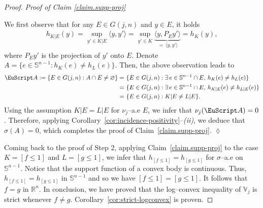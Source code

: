 \documentclass[11pt]{article}
\theoremstyle{definition}
\numberwithin{equation}{section}
\newcommand{\R}{\mathbb{R}}
\newcommand{\Sph}{\mathbb{S}}        %
\newcommand{\Gr}[2]{G(#1,#2)}        %
\newcommand{\opV}{\mathds{V}}       %
\begin{document}
\begin{proof}
\textit{Proof of Claim \ref{claim.supp-proj}}

We first observe that for any $E \in \Gr{j}{n}$ and $y \in E$, it holds
\begin{align*}
	h_{K \vert E}(y) = \sup_{y' \in K \vert E} \langle y, y' \rangle = \sup_{y' \in K} \underbrace{\langle y, P_E y' \rangle}_{\, = \, \langle y, y' \rangle} = h_K(y), 
\end{align*}
where $P_E y'$ is the projection of $y'$ onto $E$.
Denote $A = \{ e \in \Sph^{n - 1}: h_K(e) \neq h_L(e) \}$.
Then, the above observation leads to
\begin{align*}
	\EuScript A := \{ E \in \Gr{j}{n}: A \cap  E \neq \varnothing \} = & ~ 
	\{ E \in \Gr{j}{n}: \exists \, e \in \Sph^{n - 1} \cap E, \, h_K(e) \neq h_L(e) \}
	\\
	= & ~ 
	\{ E \in \Gr{j}{n}:  \exists \, e \in \Sph^{n - 1} \cap E, \, h_{K \vert E}(e) \neq h_{L \vert E}(e) \} \\
	= & ~
	\{ E \in \Gr{j}{n}:  K \vert E \neq L \vert E \}.
\end{align*}
Using the assumption $K \vert E = L \vert E$ for $\nu_j$--a.e $E$, we infer that $\nu_j(\EuScript A) = 0$.
Therefore, applying Corollary~\ref{cor:incidence-positivity}--\textit{(ii)}, we deduce that $\sigma(A) = 0$, which completes the proof of Claim~\ref{claim.supp-proj}. \hfill $\lozenge$

\medskip

Coming back to the proof of Step 2, applying Claim~\ref{claim.supp-proj} to the case $K = [f \leq 1]$ and $L = [g \leq 1]$, we infer that $h_{[f \leq 1]} = h_{[g \leq 1]}$ for $\sigma$--a.e on $\Sph^{n - 1}$.
Notice that the support function of a convex body is continuous.
Thus, $h_{[f \leq 1]} = h_{[g \leq 1]}$ in $\Sph^{n - 1}$ and so we have $[f \leq 1] = [g \leq 1]$.
It follows that $f = g$ in $\R^n$. 
In conclusion, we have proved that the log--convex inequality of $\opV_j$ is strict whenever $f \neq g$.
Corollary~\ref{cor:strict-logconvex} is proven.
\end{proof}
\end{document}
